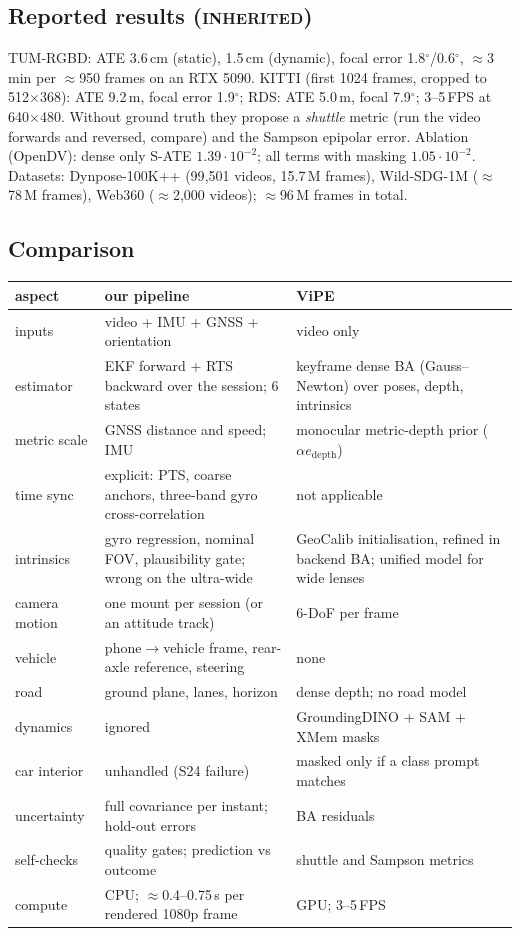 \documentclass[10pt,a4paper]{article}
\newcommand{\inh}{\textsc{inherited}}
\begin{document}
\subsection{Reported results (\inh)}
TUM-RGBD: ATE 3.6\,cm (static), 1.5\,cm (dynamic), focal error 1.8$^\circ$/0.6$^\circ$, $\approx$3\,min per
$\approx$950 frames on an RTX 5090. KITTI (first 1024 frames, cropped to 512$\times$368): ATE 9.2\,m, focal error
1.9$^\circ$; RDS: ATE 5.0\,m, focal 7.9$^\circ$; 3--5\,FPS at 640$\times$480. Without ground truth they propose a
\emph{shuttle} metric (run the video forwards and reversed, compare) and the Sampson epipolar error. Ablation
(OpenDV): dense only S-ATE $1.39\cdot10^{-2}$; all terms with masking $1.05\cdot10^{-2}$. Datasets:
Dynpose-100K++ (99{,}501 videos, 15.7\,M frames), Wild-SDG-1M ($\approx$78\,M frames), Web360 ($\approx$2{,}000 videos);
$\approx$96\,M frames in total.

\subsection{Comparison}
\begin{table}[H]
\centering\small
\begin{tabularx}{\textwidth}{@{}lLL@{}}
\toprule
aspect & our pipeline & ViPE \\
\midrule
inputs & video + IMU + GNSS + orientation & video only \\
estimator & EKF forward + RTS backward over the session; 6 states & keyframe dense BA (Gauss--Newton) over poses, depth, intrinsics \\
metric scale & GNSS distance and speed; IMU & monocular metric-depth prior ($\alpha e_\text{depth}$) \\
time sync & explicit: PTS, coarse anchors, three-band gyro cross-correlation & not applicable \\
intrinsics & gyro regression, nominal FOV, plausibility gate; wrong on the ultra-wide & GeoCalib initialisation, refined in backend BA; unified model for wide lenses \\
camera motion & one mount per session (or an attitude track) & 6-DoF per frame \\
vehicle & phone$\to$vehicle frame, rear-axle reference, steering & none \\
road & ground plane, lanes, horizon & dense depth; no road model \\
dynamics & ignored & GroundingDINO + SAM + XMem masks \\
car interior & unhandled (S24 failure) & masked only if a class prompt matches \\
uncertainty & full covariance per instant; hold-out errors & BA residuals \\
self-checks & quality gates; prediction vs outcome & shuttle and Sampson metrics \\
compute & CPU; $\approx$0.4--0.75\,s per rendered 1080p frame & GPU; 3--5\,FPS \\
\bottomrule
\end{tabularx}
\end{table}
\end{document}
